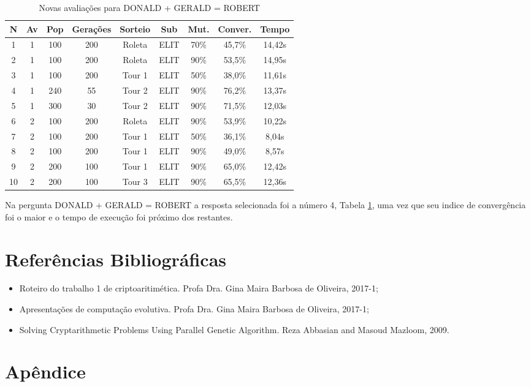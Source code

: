 \documentclass[a4paper, 12pt]{article}
\begin{document}
  \begin{table}[H]
    \centering
    \begin{tabular}{|c|c|c|c|c|c|c|c|c|}
      \hline
      N&Av & Pop & Gerações & Sorteio & Sub & Mut. & Conver. & Tempo  \\
      \hline
      1&1 & 100 & 200 & Roleta & ELIT & 70\% &45,7\% & 14,42s\\
      \hline
      2&1 & 100 & 200 & Roleta & ELIT & 90\% &53,5\% & 14,95s\\
      \hline
      3&1 & 100 & 200 & Tour 1 & ELIT & 50\% &38,0\% & 11,61s\\
      \hline
      4&1 & 240 & 55 & Tour 2 & ELIT & 90\% &76,2\% & 13,37s\\
      \hline
      5&1 & 300 & 30 & Tour 2 & ELIT & 90\% &71,5\% & 12,03s\\
      \hline
      6&2 & 100 & 200 & Roleta & ELIT & 90\% &53,9\% & 10,22s\\
      \hline
      7&2 & 100 & 200 & Tour 1 & ELIT & 50\% &36,1\% & 8,04s\\
      \hline
      8&2 & 100 & 200 & Tour 1 & ELIT & 90\% &49,0\% & 8,57s\\
      \hline
      9&2 & 200 & 100 & Tour 1 & ELIT & 90\% &65,0\% & 12,42s\\
      \hline
      10&2 & 200 & 100 & Tour 3 & ELIT & 90\% &65,5\% & 12,36s\\
      \hline
    \end{tabular}
    \caption{Novas avaliações para DONALD + GERALD = ROBERT}
    \label{tab:donald}
  \end{table}

  Na pergunta DONALD + GERALD = ROBERT a resposta selecionada foi a número 4,
  Tabela \ref{tab:donald}, uma vez que seu indice de convergência foi o maior
  e o tempo de execução foi próximo dos restantes.

\section{Referências Bibliográficas}
  \begin{itemize}
    \item Roteiro do trabalho 1 de criptoaritimética. Profa Dra. Gina Maira Barbosa de Oliveira, 2017-1;
    \item Apresentações de computação evolutiva. Profa Dra. Gina Maira Barbosa de Oliveira, 2017-1;
    \item Solving Cryptarithmetic Problems Using Parallel Genetic Algorithm. Reza Abbasian and Masoud Mazloom, 2009.
  \end{itemize}



\section{Apêndice}
  
\end{document}
